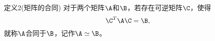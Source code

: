 \begin{frame}
  \begin{footnotesize}
    \begin{block}{定义2(矩阵的合同)}
      对于两个矩阵$\A$和$\B$，若存在可逆矩阵$\C$，使得
      $$
      \C^T\A\C=\B,
      $$
      就称$\A$合同于$\B$，记作$\A\simeq\B$。
    \end{block}
  \end{footnotesize}
\end{frame}


    





